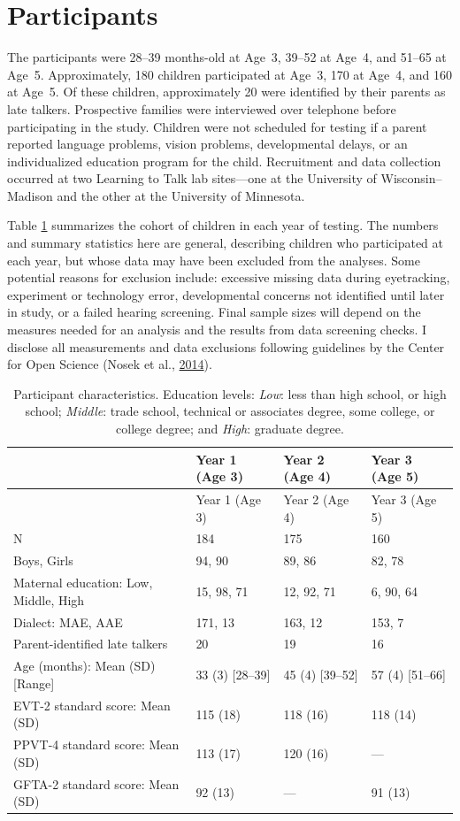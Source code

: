 \documentclass [11pt, proquest] {uwthesis}[2015/03/03]
\begin{document}
\section{Participants}\label{participants}

The participants were 28--39 months-old at Age~3, 39--52 at Age~4, and
51--65 at Age~5. Approximately, 180 children participated at Age~3, 170
at Age~4, and 160 at Age~5. Of these children, approximately 20 were
identified by their parents as late talkers. Prospective families were
interviewed over telephone before participating in the study. Children
were not scheduled for testing if a parent reported language problems,
vision problems, developmental delays, or an individualized education
program for the child. Recruitment and data collection occurred at two
Learning to Talk lab sites---one at the University of Wisconsin--Madison
and the other at the University of Minnesota.

Table \ref{tab:participant-info} summarizes the cohort of children in
each year of testing. The numbers and summary statistics here are
general, describing children who participated at each year, but whose
data may have been excluded from the analyses. Some potential reasons
for exclusion include: excessive missing data during eyetracking,
experiment or technology error, developmental concerns not identified
until later in study, or a failed hearing screening. Final sample sizes
will depend on the measures needed for an analysis and the results from
data screening checks. I disclose all measurements and data exclusions
following guidelines by the Center for Open Science (Nosek et al.,
\protect\hyperlink{ref-OSF_Statement}{2014}).
\begin{longtable}[]{@{}llll@{}}
\caption{\label{tab:participant-info} Participant characteristics. Education
levels: \emph{Low}: less than high school, or high school;
\emph{Middle}: trade school, technical or associates degree, some
college, or college degree; and \emph{High}: graduate
degree.}\tabularnewline
\toprule
& Year 1 (Age 3) & Year 2 (Age 4) & Year 3 (Age 5)\tabularnewline
\midrule
\endfirsthead
\toprule
& Year 1 (Age 3) & Year 2 (Age 4) & Year 3 (Age 5)\tabularnewline
\midrule
\endhead
N & 184 & 175 & 160\tabularnewline
Boys, Girls & 94, 90 & 89, 86 & 82, 78\tabularnewline
Maternal education: Low, Middle, High & 15, 98, 71 & 12, 92, 71 & 6, 90,
64\tabularnewline
Dialect: MAE, AAE & 171, 13 & 163, 12 & 153, 7\tabularnewline
Parent-identified late talkers & 20 & 19 & 16\tabularnewline
Age (months): Mean (SD) {[}Range{]} & 33 (3) {[}28--39{]} & 45 (4)
{[}39--52{]} & 57 (4) {[}51--66{]}\tabularnewline
EVT-2 standard score: Mean (SD) & 115 (18) & 118 (16) & 118
(14)\tabularnewline
PPVT-4 standard score: Mean (SD) & 113 (17) & 120 (16) &
---\tabularnewline
GFTA-2 standard score: Mean (SD) & 92 (13) & --- & 91
(13)\tabularnewline
\bottomrule
\end{longtable}
\end{document}
